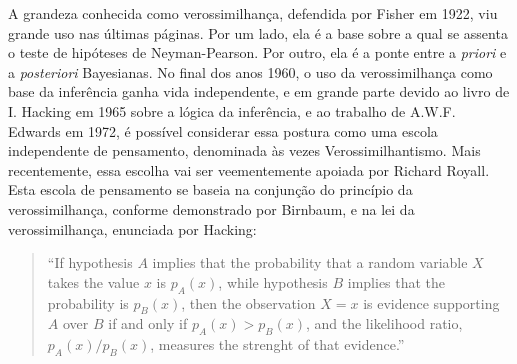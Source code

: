 A grandeza conhecida como verossimilhança, defendida por Fisher em 1922, viu grande uso nas últimas páginas. Por um lado,
ela é a base sobre a qual se assenta o teste de hipóteses de Neyman-Pearson. Por outro, ela é a ponte entre a {\em priori}
e a {\em posteriori} Bayesianas. No final dos anos 1960, o uso da verossimilhança como base da inferência ganha vida 
independente, e em grande parte devido ao livro de I. Hacking em 1965 sobre a lógica da inferência, 
e ao trabalho de A.W.F. Edwards em 1972, é possível considerar essa postura como
uma escola independente de pensamento, denominada às vezes Verossimilhantismo. Mais recentemente, essa escolha vai ser
veementemente apoiada por Richard Royall. Esta escola de pensamento se baseia na conjunção do princípio da 
verossimilhança, conforme demonstrado por Birnbaum, e na lei da verossimilhança, enunciada por Hacking:

\begin{quote}
``If hypothesis $A$ implies that the probability that a random variable $X$ takes the value $x$ is $p_A(x)$, while
hypothesis $B$ implies that the probability is $p_B(x)$, then the observation $X=x$ is evidence supporting $A$ over $B$
if and only if $p_A(x) > p_B(x)$, and the likelihood ratio, $p_A(x)/p_B(x)$, measures the strenght of that evidence.''
\citep{Hacking65}
\end{quote}

